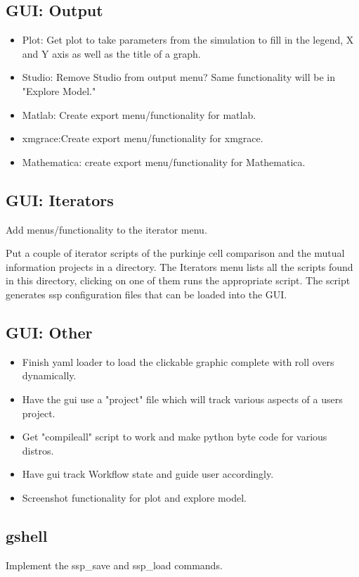 \documentclass[12pt]{article}
\begin{document}
\subsection{GUI: Output}
\begin{itemize}
\item Plot: Get plot to take parameters from the simulation to fill in
  the legend, X and Y axis as well as the title of a graph.
\item Studio: Remove Studio from output menu? Same functionality will be in "Explore Model."
\item Matlab: Create export menu/functionality for matlab.
\item xmgrace:Create export menu/functionality for xmgrace.
\item Mathematica: create export menu/functionality for Mathematica.
\end{itemize}


\subsection{GUI: Iterators}
Add menus/functionality to the iterator menu.

Put a couple of iterator scripts of the purkinje cell comparison and
the mutual information projects in a directory.  The Iterators menu
lists all the scripts found in this directory, clicking on one of them
runs the appropriate script.  The script generates ssp configuration
files that can be loaded into the GUI.


\subsection{GUI: Other}
\begin{itemize}
\item Finish yaml loader to load the clickable graphic complete with
  roll overs dynamically.
\item Have the gui use a "project" file which will track various
  aspects of a users project.
\item Get "compileall" script to work and make python byte code for
  various distros.
\item Have gui track Workflow state and guide user accordingly.
\item Screenshot functionality for plot and explore model.
\end{itemize}

\subsection{gshell}
Implement the ssp\_save and ssp\_load commands.
\end{document}
